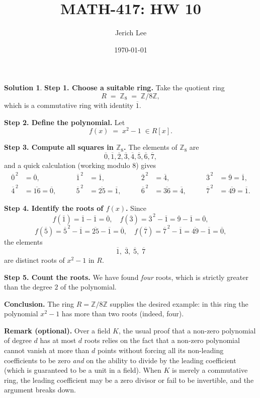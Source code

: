 \documentclass[12pt]{article}
\title{MATH-417: HW 10}
\author{Jerich Lee}
\date{\today}
\theoremstyle{definition} %
\newtheorem{solution}{Solution}
\theoremstyle{plain} %
\begin{document}
\maketitle
\begin{solution}
  \textbf{Step 1. Choose a suitable ring.}  
  Take the quotient ring
  \[
  R \;=\; \mathbb{Z}_8 \;=\; \mathbb{Z}/8\mathbb{Z},
  \]
  which is a commutative ring with identity $\overline{1}$.
  
  \medskip
  \textbf{Step 2. Define the polynomial.}  
  Let
  \[
  f(x) \;=\; x^{2}-1\;\in R[x].
  \]
  
  \medskip
  \textbf{Step 3. Compute all squares in $\mathbb{Z}_8$.}  
  The elements of $\mathbb{Z}_8$ are
  \[
  \overline{0},\overline{1},\overline{2},\overline{3},\overline{4},\overline{5},\overline{6},\overline{7},
  \]
  and a quick calculation (working modulo $8$) gives
  \[
  \begin{aligned}
  \overline{0}^{\,2}&=\overline{0}, &\qquad
  \overline{1}^{\,2}&=\overline{1}, &\qquad
  \overline{2}^{\,2}&=\overline{4}, &\qquad
  \overline{3}^{\,2}&=\overline{9}=\overline{1},\\[4pt]
  \overline{4}^{\,2}&=\overline{16}=\overline{0}, &\qquad
  \overline{5}^{\,2}&=\overline{25}=\overline{1}, &\qquad
  \overline{6}^{\,2}&=\overline{36}=\overline{4}, &\qquad
  \overline{7}^{\,2}&=\overline{49}=\overline{1}.
  \end{aligned}
  \]
  
  \medskip
  \textbf{Step 4. Identify the roots of $f(x)$.}  
  Since
  \[
  f(\overline{1})=\overline{1}-\overline{1}=\overline{0},\quad
  f(\overline{3})=\overline{3}^{\,2}-\overline{1}=\overline{9}-\overline{1}=\overline{0},
  \]
  \[
  f(\overline{5})=\overline{5}^{\,2}-\overline{1}=\overline{25}-\overline{1}=\overline{0},\quad
  f(\overline{7})=\overline{7}^{\,2}-\overline{1}=\overline{49}-\overline{1}=\overline{0},
  \]
  the elements
  \[
  \overline{1},\;\overline{3},\;\overline{5},\;\overline{7}
  \]
  are distinct roots of $x^{2}-1$ in $R$.
  
  \medskip
  \textbf{Step 5. Count the roots.}  
  We have found \emph{four} roots, which is strictly greater than the degree $2$ of the polynomial.
  
  \medskip
  \textbf{Conclusion.}  
  The ring $R=\mathbb{Z}/8\mathbb{Z}$ supplies the desired example: in this ring the polynomial $x^{2}-1$ has more than two roots (indeed, four).
  
  \medskip
  \textbf{Remark (optional).}  
  Over a field $K$, the usual proof that a non-zero polynomial of degree $d$ has at most $d$ roots relies on the fact that a non-zero polynomial cannot vanish at more than $d$ points without forcing all its non-leading coefficients to be zero \emph{and} on the ability to divide by the leading coefficient (which is guaranteed to be a unit in a field).  When $K$ is merely a commutative ring, the leading coefficient may be a zero divisor or fail to be invertible, and the argument breaks down.
  \end{solution}
\end{document}
